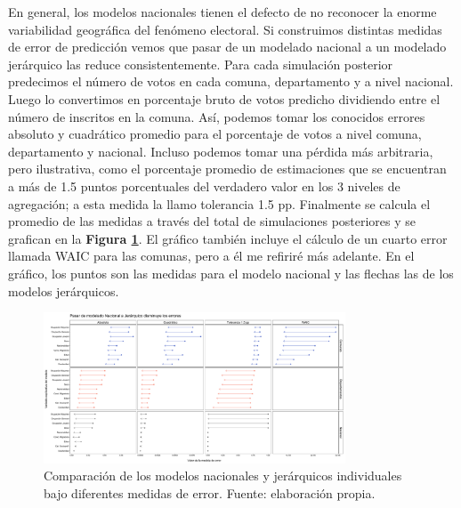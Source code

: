 En general, los modelos nacionales tienen el defecto de no reconocer la enorme variabilidad geográfica del fenómeno electoral. Si construimos distintas medidas de error de predicción vemos que pasar de un modelado nacional a un modelado jerárquico las reduce consistentemente. Para cada simulación posterior predecimos el número de votos en cada comuna, departamento y a nivel nacional. Luego lo convertimos en porcentaje bruto de votos predicho dividiendo entre el número de inscritos en la comuna. Así, podemos tomar los conocidos errores absoluto y cuadrático promedio para el porcentaje de votos a nivel comuna, departamento y nacional. Incluso podemos tomar una pérdida más arbitraria, pero ilustrativa, como el porcentaje promedio de estimaciones que se encuentran a más de 1.5 puntos porcentuales del verdadero valor en los 3 niveles de agregación; a esta medida la llamo tolerancia 1.5 pp. Finalmente se calcula el promedio de las medidas a través del total de simulaciones posteriores y se grafican en la \textbf{Figura \ref{fig:Errores_Modelos_Individuales}}. El gráfico también incluye el cálculo de un cuarto error llamada WAIC para las comunas, pero a él me refiriré más adelante. En el gráfico, los puntos son las medidas para el modelo nacional y las flechas las de los modelos jerárquicos.\\ 

\begin{figure}[h]
	\centering
	\includegraphics[width = 0.8\textwidth]{Figs/Modelado/Graf_Errores_Modelos_Individuales}
	\caption{Comparación de los modelos nacionales y jerárquicos individuales bajo diferentes medidas de error. Fuente: elaboración propia.}
	\label{fig:Errores_Modelos_Individuales}
\end{figure} 

